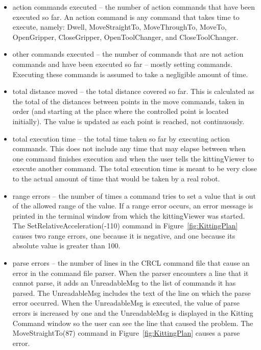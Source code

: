 \begin{itemize}

\item \sf action commands executed \rm -- the number of action commands that
  have been executed so far. An action command is any command that takes
  time to execute, namely: Dwell, MoveStraightTo, MoveThroughTo, MoveTo,
  OpenGripper, CloseGripper, OpenToolChanger, and CloseToolChanger.\\

\item \sf other commands executed \rm -- the number of commands that are
  not action commands and have been executed so far -- mostly setting
  commands. Executing these commands is assumed to take a negligible amount
  of time.\\

\item \sf total distance moved \rm -- the total distance covered so
  far. This is calculated as the total of the distances between points in
  the move commands, taken in order (and starting at the place where the
  controlled point is located initially). The value is updated as each point
  is reached, not continuously.\\

\item \sf total execution time \rm -- the total time taken so far by
  executing action commands. This does not include any time that may elapse
  between when one command finishes execution and when the user tells the
  kittingViewer to execute another command. The total execution time is
  meant to be very close to the actual amount of time that would be taken
  by a real robot.\\

\item \sf range errors \rm -- the number of times a command tries to set a
  value that is out of the allowed range of the value. If a range error
  occurs, an error message is printed in the terminal window from which the
  kittingViewer was started. The \sf SetRelativeAcceleration(-110) \rm
  command in Figure~\ref{fig:KittingPlan} causes two range errors, one
  because it is negative, and one because its absolute value is greater
  than 100.\\

\item \sf parse errors \rm -- the number of lines in the CRCL command file
  that cause an error in the command file parser. When the parser
  encounters a line that it cannot parse, it adds an UnreadableMsg to the
  list of commands it has parsed. The UnreadableMsg includes the text of
  the line on which the parse error occurred. When the UnreadableMsg is
  executed, the value of parse errors is increased by one and the
  UnreadableMsg is displayed in the Kitting Command window so the user can
  see the line that caused the problem. The \sf MoveStraightTo(87) \rm
  command in Figure~\ref{fig:KittingPlan} causes a parse error.\\


\end{itemize}
